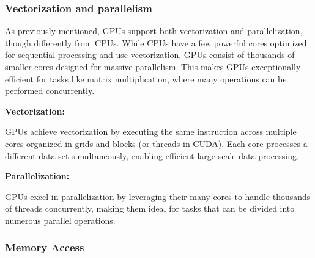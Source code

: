 \subsubsection{Vectorization and parallelism}

As previously mentioned, GPUs support both vectorization and parallelization, though differently from CPUs. While CPUs have a few powerful cores optimized for sequential processing and use vectorization, GPUs consist of thousands of smaller cores designed for massive parallelism. This makes GPUs exceptionally efficient for tasks like matrix multiplication, where many operations can be performed concurrently.

\begin{center}
    \textbf{Vectorization:}    
\end{center}
GPUs achieve vectorization by executing the same instruction across multiple cores organized in grids and blocks (or threads in CUDA). Each core processes a different data set simultaneously, enabling efficient large-scale data processing.

\begin{center}
    \textbf{Parallelization:}    
\end{center}
GPUs excel in parallelization by leveraging their many cores to handle thousands of threads concurrently, making them ideal for tasks that can be divided into numerous parallel operations.
 
\subsubsection{Memory Access}


